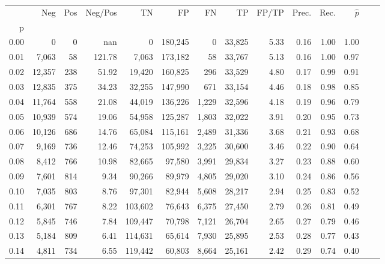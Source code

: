 \begin{tabular}{rrrrrrrrrrrrrr}
\toprule
{} &     Neg &  Pos & Neg/Pos &       TN &       FP &      FN &      TP & FP/TP & Prec. &  Rec. & $\hat{p}$ \\
p    &         &      &         &          &          &         &         &       &       &       &           \\
\midrule
0.00 &       0 &    0 &     nan &        0 &  180,245 &       0 &  33,825 &  5.33 &  0.16 &  1.00 &      1.00 \\
0.01 &   7,063 &   58 &  121.78 &    7,063 &  173,182 &      58 &  33,767 &  5.13 &  0.16 &  1.00 &      0.97 \\
0.02 &  12,357 &  238 &   51.92 &   19,420 &  160,825 &     296 &  33,529 &  4.80 &  0.17 &  0.99 &      0.91 \\
0.03 &  12,835 &  375 &   34.23 &   32,255 &  147,990 &     671 &  33,154 &  4.46 &  0.18 &  0.98 &      0.85 \\
0.04 &  11,764 &  558 &   21.08 &   44,019 &  136,226 &   1,229 &  32,596 &  4.18 &  0.19 &  0.96 &      0.79 \\
0.05 &  10,939 &  574 &   19.06 &   54,958 &  125,287 &   1,803 &  32,022 &  3.91 &  0.20 &  0.95 &      0.73 \\
0.06 &  10,126 &  686 &   14.76 &   65,084 &  115,161 &   2,489 &  31,336 &  3.68 &  0.21 &  0.93 &      0.68 \\
0.07 &   9,169 &  736 &   12.46 &   74,253 &  105,992 &   3,225 &  30,600 &  3.46 &  0.22 &  0.90 &      0.64 \\
0.08 &   8,412 &  766 &   10.98 &   82,665 &   97,580 &   3,991 &  29,834 &  3.27 &  0.23 &  0.88 &      0.60 \\
0.09 &   7,601 &  814 &    9.34 &   90,266 &   89,979 &   4,805 &  29,020 &  3.10 &  0.24 &  0.86 &      0.56 \\
0.10 &   7,035 &  803 &    8.76 &   97,301 &   82,944 &   5,608 &  28,217 &  2.94 &  0.25 &  0.83 &      0.52 \\
0.11 &   6,301 &  767 &    8.22 &  103,602 &   76,643 &   6,375 &  27,450 &  2.79 &  0.26 &  0.81 &      0.49 \\
0.12 &   5,845 &  746 &    7.84 &  109,447 &   70,798 &   7,121 &  26,704 &  2.65 &  0.27 &  0.79 &      0.46 \\
0.13 &   5,184 &  809 &    6.41 &  114,631 &   65,614 &   7,930 &  25,895 &  2.53 &  0.28 &  0.77 &      0.43 \\
0.14 &   4,811 &  734 &    6.55 &  119,442 &   60,803 &   8,664 &  25,161 &  2.42 &  0.29 &  0.74 &      0.40 \\

\end{tabular}
